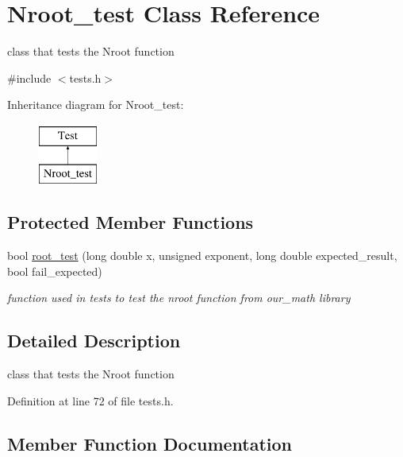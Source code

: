 \hypertarget{class_nroot__test}{}\section{Nroot\+\_\+test Class Reference}
\label{class_nroot__test}


class that tests the Nroot function  




{\ttfamily \#include $<$tests.\+h$>$}

Inheritance diagram for Nroot\+\_\+test\+:\begin{figure}[H]
\begin{center}
\leavevmode
\includegraphics[height=2.000000cm]{class_nroot__test}
\end{center}
\end{figure}
\subsection*{Protected Member Functions}
\begin{DoxyCompactItemize}
\item 
bool \mbox{\hyperlink{class_nroot__test_a67bf85e70268afc965812e34485a2811}{root\+\_\+test}} (long double x, unsigned exponent, long double expected\+\_\+result, bool fail\+\_\+expected)
\begin{DoxyCompactList}\small\item\em function used in tests to test the nroot function from our\+\_\+math library \end{DoxyCompactList}\end{DoxyCompactItemize}


\subsection{Detailed Description}
class that tests the Nroot function 

Definition at line 72 of file tests.\+h.



\subsection{Member Function Documentation}
\mbox{\label{class_nroot__test_a67bf85e70268afc965812e34485a2811}} 
